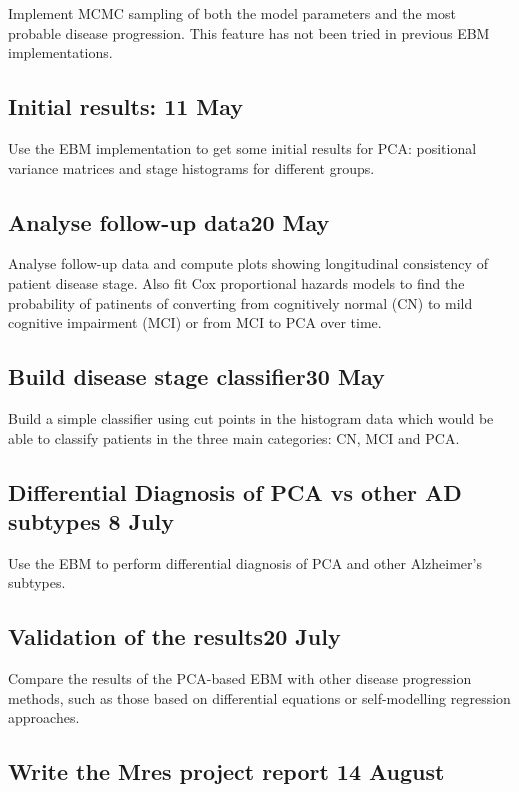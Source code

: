 \documentclass[12pt,a4paper,oneside]{report}
\begin{document}
Implement MCMC sampling of both the model parameters and the most probable disease progression. This feature has not been tried in previous EBM implementations.

\subsection*{\noindent Initial results: \hfill  11 May} 
Use the EBM implementation to get some initial results for PCA: positional variance matrices and stage histograms for different groups.

\subsection*{\noindent Analyse follow-up data\hfill  20 May}
Analyse follow-up data and compute plots showing longitudinal consistency of patient disease stage. Also fit Cox proportional hazards models to find the probability of patinents of converting from cognitively normal (CN) to mild cognitive impairment (MCI) or from MCI to PCA over time.

\subsection*{\noindent Build disease stage classifier\hfill  30 May}
Build a simple classifier using cut points in the histogram data which would be able to classify patients in the three main categories: CN, MCI and PCA.

\subsection*{\noindent Differential Diagnosis of PCA vs other AD subtypes \hfill 8 July}
Use the EBM to perform differential diagnosis of PCA and other Alzheimer's subtypes. 

\subsection*{\noindent Validation of the results\hfill  20 July}
Compare the results of the PCA-based EBM with other disease progression methods, such as those based on differential equations or self-modelling regression approaches.

\subsection*{\noindent Write the Mres project report  \hfill  14 August}
\end{document}
